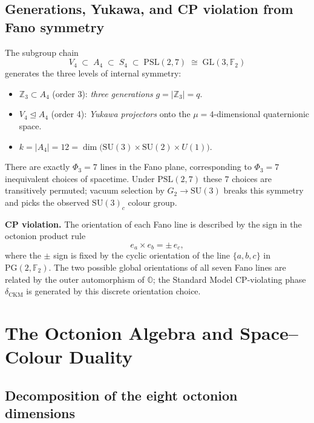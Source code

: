 \subsection{Generations, Yukawa, and CP violation from Fano symmetry}

The subgroup chain
\begin{equation}
  \label{eq:fano_chain}
  V_4 \;\subset\; A_4 \;\subset\; S_4
  \;\subset\; \mathrm{PSL}(2,7) \;\cong\; \mathrm{GL}(3,\mathbb{F}_2)
\end{equation}
generates the three levels of internal symmetry:
\begin{itemize}
  \item $\mathbb{Z}_3 \subset A_4$ (order 3): \emph{three generations}
        $g = |\mathbb{Z}_3| = q$.
  \item $V_4 \trianglelefteq A_4$ (order 4): \emph{Yukawa projectors}
        onto the $\mu=4$-dimensional quaternionic space.
  \item $k = |A_4| = 12 = \dim\bigl(\mathrm{SU}(3)\times\mathrm{SU}(2)\times U(1)\bigr)$.
\end{itemize}
\noindent
There are exactly $\Phi_3=7$ lines in the Fano plane, corresponding to
$\Phi_3=7$ inequivalent choices of spacetime.  Under $\mathrm{PSL}(2,7)$
these $7$ choices are transitively permuted; vacuum selection by
$G_2\to\mathrm{SU}(3)$ breaks this symmetry and picks the observed
$\mathrm{SU}(3)_c$ colour group.

\textbf{CP violation.}  The orientation of each Fano line is described
by the sign in the octonion product rule
\begin{equation}
  \label{eq:fano_cp}
  e_a \times e_b = \pm\, e_c,
\end{equation}
where the $\pm$ sign is fixed by the cyclic orientation of the line
$\{a,b,c\}$ in $\mathrm{PG}(2,\mathbb{F}_2)$.  The two possible global
orientations of all seven Fano lines are related by the outer
automorphism of $\mathbb{O}$; the Standard Model CP-violating phase
$\delta_{\mathrm{CKM}}$ is generated by this discrete orientation choice.

\section{The Octonion Algebra and Space--Colour Duality}
\label{sec:octonion}

\subsection{Decomposition of the eight octonion dimensions}

